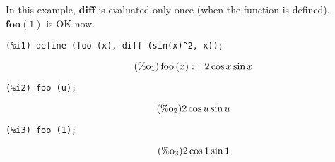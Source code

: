 \documentclass[12pt,leqno]{article}
\begin{document}
\begin{enumerate}
In this example, $\mathbf{diff}$ is evaluated only once (when the function is defined).
$\mathbf{foo} (1)$ is OK now.
\begin{verbatim}
(%i1) define (foo (x), diff (sin(x)^2, x));
\end{verbatim}
\begin{equation}
\tag{$\mathop{\mathrm{\%o}}_{1}$}\mathop{\mathrm{foo}}\left(x\right) := 2 \cos x \sin x
\label{eq:doc-group1-code27-1-1}
\end{equation}
\begin{verbatim}
(%i2) foo (u);
\end{verbatim}
\begin{equation}
\tag{$\mathop{\mathrm{\%o}}_{2}$}2 \cos u \sin u
\label{eq:doc-group1-code27-2-1}
\end{equation}
\begin{verbatim}
(%i3) foo (1);
\end{verbatim}
\begin{equation}
\tag{$\mathop{\mathrm{\%o}}_{3}$}2 \cos 1 \sin 1
\label{eq:doc-group1-code27-3-1}
\end{equation}


\end{enumerate}
\end{document}
